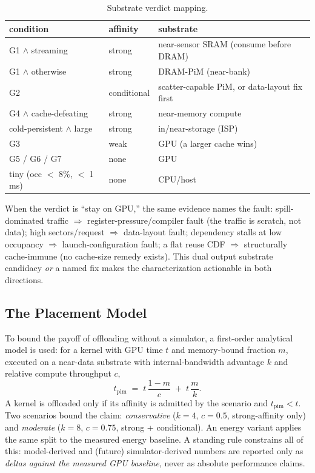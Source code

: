 \begin{table}[t]
\centering
\caption{Substrate verdict mapping.}
\label{tab:verdict}
\begin{tabular}{@{}lll@{}}
\toprule
condition & affinity & substrate \\
\midrule
G1 $\wedge$ streaming & strong & near-sensor SRAM (consume before DRAM) \\
G1 $\wedge$ otherwise & strong & DRAM-PiM (near-bank) \\
G2 & conditional & scatter-capable PiM, or data-layout fix first \\
G4 $\wedge$ cache-defeating & strong & near-memory compute \\
cold-persistent $\wedge$ large & strong & in/near-storage (ISP) \\
G3 & weak & GPU (a larger cache wins) \\
G5 / G6 / G7 & none & GPU \\
tiny (occ $<$ 8\%, $<$ 1\,ms) & none & CPU/host \\
\bottomrule
\end{tabular}
\end{table}

When the verdict is ``stay on GPU,'' the same evidence names the fault: spill-dominated traffic $\Rightarrow$ register-pressure/compiler fault (the traffic is scratch, not data); high sectors/request $\Rightarrow$ data-layout fault; dependency stalls at low occupancy $\Rightarrow$ launch-configuration fault; a flat reuse CDF $\Rightarrow$ structurally cache-immune (no cache-size remedy exists). This dual output substrate candidacy \emph{or} a named fix makes the characterization actionable in both directions.

\subsection{The Placement Model}
\label{sec:met-model}

To bound the payoff of offloading without a simulator, a first-order analytical model is used: for a kernel with GPU time $t$ and memory-bound fraction $m$, executed on a near-data substrate with internal-bandwidth advantage $k$ and relative compute throughput $c$,
\begin{equation}
t_{\text{pim}} \;=\; t\,\frac{1-m}{c} \;+\; t\,\frac{m}{k}.
\label{eq:placement}
\end{equation}
A kernel is offloaded only if its affinity is admitted by the scenario and $t_{\text{pim}} < t$. Two scenarios bound the claim: \emph{conservative} ($k{=}4$, $c{=}0.5$, strong-affinity only) and \emph{moderate} ($k{=}8$, $c{=}0.75$, strong + conditional). An energy variant applies the same split to the measured energy baseline. A standing rule constrains all of this: model-derived and (future) simulator-derived numbers are reported only as \emph{deltas against the measured GPU baseline}, never as absolute performance claims.


